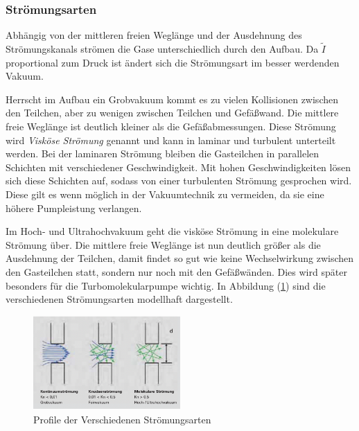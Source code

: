 \subsubsection{Strömungsarten}
Abhängig von der mittleren freien Weglänge
und der Ausdehnung des Strömungskanals strömen die Gase unterschiedlich durch den Aufbau.
Da $\tilde{I}$ proportional zum Druck ist ändert sich die Strömungsart im besser werdenden Vakuum.

Herrscht im Aufbau ein Grobvakuum kommt es zu vielen Kollisionen zwischen den Teilchen,
aber zu wenigen zwischen Teilchen und Gefäßwand.
Die mittlere freie Weglänge ist deutlich kleiner als die Gefäßabmessungen.
Diese Strömung wird \textit{Visköse Strömung} genannt 
und kann in laminar und turbulent unterteilt werden.
Bei der laminaren Strömung bleiben die Gasteilchen in parallelen Schichten mit verschiedener Geschwindigkeit.
Mit hohen Geschwindigkeiten lösen sich diese Schichten auf, 
sodass von einer turbulenten Strömung gesprochen wird. 
Diese gilt es wenn möglich in der Vakuumtechnik zu vermeiden,
da sie eine höhere Pumpleistung verlangen.

Im Hoch- und Ultrahochvakuum geht die visköse Strömung in eine molekulare Strömung über.
Die mittlere freie Weglänge ist nun deutlich größer als die Ausdehnung der Teilchen,
damit findet so gut wie keine Wechselwirkung zwischen den Gasteilchen statt,
sondern nur noch mit den Gefäßwänden.
Dies wird später besonders für die Turbomolekularpumpe wichtig.
In Abbildung (\ref{fig:strömung}) sind die verschiedenen Strömungsarten modellhaft dargestellt.
\begin{figure}[h]
    \centering
    \includegraphics[width=0.5\textwidth]{abb/Stroemungen.png}
    \caption{Profile der Verschiedenen Strömungsarten \cite{Pfeifer}}
    \label{fig:strömung}
\end{figure}

